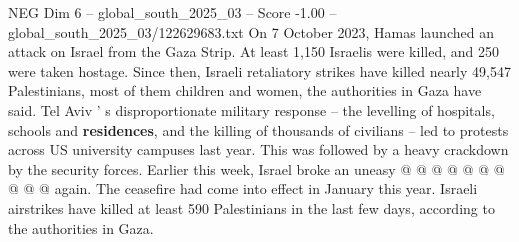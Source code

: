 \begin{textsample}{NEG Dim 6 – global\_south\_2025\_03 – Score -1.00 – global\_south\_2025\_03/122629683.txt}
On 7 October 2023, Hamas launched an attack on Israel from the Gaza Strip.
At least 1,150 Israelis were killed, and 250 were taken hostage.
Since then, Israeli retaliatory strikes have killed nearly 49,547 Palestinians, most of them children and women, the authorities in Gaza have said.
Tel Aviv ' s disproportionate military response -- the levelling of hospitals, schools and \textbf{residences}, and the killing of thousands of civilians -- led to protests across US university campuses last year.
This was followed by a heavy crackdown by the security forces.
Earlier this week, Israel broke an uneasy @ @ @ @ @ @ @ @ @ @ again.
The ceasefire had come into effect in January this year.
Israeli airstrikes have killed at least 590 Palestinians in the last few days, according to the authorities in Gaza.

\end{textsample}

